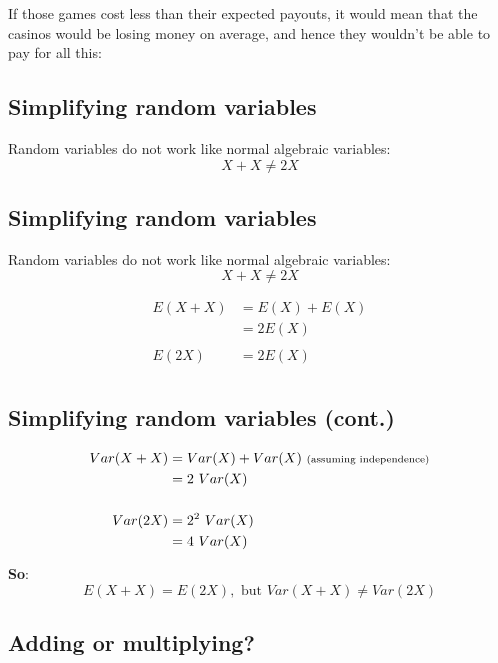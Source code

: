 \documentclass[
]{article}
\begin{document}
If those games cost less than their expected payouts, it would mean that
the casinos would be losing money on average, and hence they wouldn't be
able to pay for all this:

\hypertarget{simplifying-random-variables}{%
\subsection{Simplifying random
variables}\label{simplifying-random-variables}}

Random variables do not work like normal algebraic variables: \[
X + X \ne 2X
\]

\hypertarget{simplifying-random-variables-1}{%
\subsection{Simplifying random
variables}\label{simplifying-random-variables-1}}

Random variables do not work like normal algebraic variables: \[
X + X \ne 2X
\]

\[
\begin{align*}
E(X + X) &= E(X) + E(X) \\
&= 2 E(X) \\
&~  \\
E(2X) &= 2 E(X) \\
&~ 
\end{align*}
\]

\hypertarget{simplifying-random-variables-cont.}{%
\subsection{Simplifying random variables
(cont.)}\label{simplifying-random-variables-cont.}}

\[
\begin{align*}
Var(X + X) &= Var(X) + Var(X)~{\scriptsize \text{(assuming independence)}} \\
&= 2~Var(X) \\
&~  \\
Var(2X) &= 2^2~Var(X) \\
&= 4~Var(X)
\end{align*}
\]

\textbf{So}: \[
E(X + X)  = E(2X), \text{ but }  Var(X + X) \ne Var(2X)
\]

\hypertarget{adding-or-multiplying}{%
\subsection{Adding or multiplying?}\label{adding-or-multiplying}}
\end{document}
